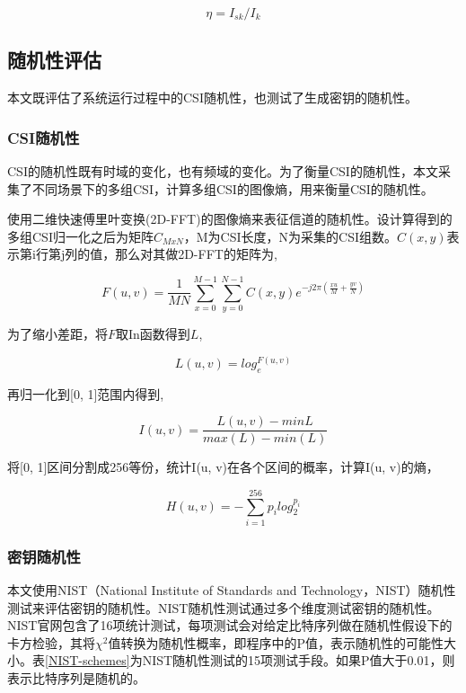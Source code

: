 \documentclass[master]{seuthesis} %
\begin{document}
\begin{Main}
\begin{equation} \label{safe_rate_equation}
  \eta = I_{sk} / I_k
\end{equation}

\subsection{随机性评估}

本文既评估了系统运行过程中的CSI随机性，也测试了生成密钥的随机性。

\subsubsection{CSI随机性}

CSI的随机性既有时域的变化，也有频域的变化。为了衡量CSI的随机性，本文采集了不同场景下的多组CSI，计算多组CSI的图像熵，用来衡量CSI的随机性。

使用二维快速傅里叶变换(2D-FFT)的图像熵来表征信道的随机性。设计算得到的多组CSI归一化之后为矩阵$C_{MxN}$，M为CSI长度，N为采集的CSI组数。$C(x, y)$表示第i行第j列的值，那么对其做2D-FFT的矩阵为,

\begin{equation}
  F(u, v) = \frac{1}{MN}\sum_{x=0}^{M-1}\sum_{y=0}^{N-1} C(x,y) e^{-j2\pi(\frac{xu}{M}+\frac{yv}{N})}
\end{equation}


为了缩小差距，将$F$取In函数得到$L$,

\begin{equation}
  L(u, v) = log_e^{F(u, v)}
\end{equation}

再归一化到[0, 1]范围内得到,

\begin{equation}
  I(u, v) = \frac{L(u, v) - min{L}}{max(L) - min(L)}
\end{equation}

将[0, 1]区间分割成256等份，统计I(u, v)在各个区间的概率，计算I(u, v)的熵，

\begin{equation} \label{entropy_fft2d_equation}
  H(u, v) = -\sum_{i=1}^{256} p_i log_2^{p_i}
\end{equation}

\subsubsection{密钥随机性}

本文使用NIST（National Institute of Standards and Technology，NIST）随机性测试来评估密钥的随机性\cite{bassham2010statistical}。NIST随机性测试通过多个维度测试密钥的随机性\cite{zaman2012review}。NIST官网包含了16项统计测试，每项测试会对给定比特序列做在随机性假设下的卡方检验，其将$\chi^2$值转换为随机性概率，即程序中的P值，表示随机性的可能性大小。表\ref{NIST-schemes}为NIST随机性测试的15项测试手段。如果P值大于0.01，则表示比特序列是随机的。


\end{Main}
\end{document}

